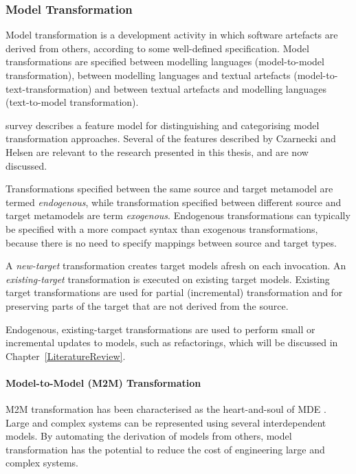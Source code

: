 \subsubsection{Model Transformation}
\label{subsubsec:model_transformation}
Model transformation is a development activity in which software artefacts are derived from others, according to some well-defined specification. Model transformations are specified between modelling languages (model-to-model transformation), between modelling languages and textual artefacts (model-to-text-transformation) and between textual artefacts and modelling languages (text-to-model transformation).

\cite{czarnecki06survey} survey describes a feature model for distinguishing and categorising model transformation approaches. Several of the features described by Czarnecki and Helsen are relevant to the research presented in this thesis, and are now discussed. 


Transformations specified between the same source and target metamodel are termed \emph{endogenous}, while transformation specified between different source and target metamodels are term \emph{exogenous}. Endogenous transformations can typically be specified with a more compact syntax than exogenous transformations, because there is no need to specify mappings between source and target types.

A \emph{new-target} transformation creates target models afresh on each invocation. An \emph{existing-target} transformation is executed on existing target models. Existing target transformations are used for partial (incremental) transformation and for preserving parts of the target that are not derived from the source.

Endogenous, existing-target transformations are used to perform small or incremental updates to models, such as refactorings, which will be discussed in Chapter~\ref{LiteratureReview}.


\paragraph{Model-to-Model (M2M) Transformation} M2M transformation has been characterised as the heart-and-soul of MDE \cite{sendall03heart}. Large and complex systems can be represented using several interdependent models. By automating the derivation of models from others, model transformation has the potential to reduce the cost of engineering large and complex systems.

